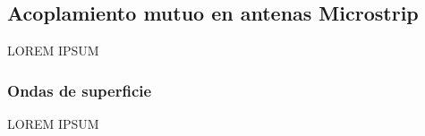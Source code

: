 \subsection{Acoplamiento mutuo en antenas Microstrip}
\label{subsec_acoplamiento_microstrip}
LOREM IPSUM
\subsubsection{Ondas de superficie}
\label{subsubsec_microstrip_ondas_superficie}
LOREM IPSUM


